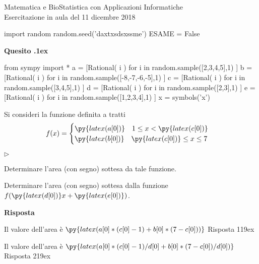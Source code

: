 \documentclass[11pt,twoside,a4paper]{article}
\newcommand{\mylabel}[1]{#1\hfill}
\renewenvironment{itemize}
  {\begin{list}{$\triangleright$}{%
   \setlength{\parskip}{0mm}
   \setlength{\topsep}{.4\baselineskip}
   \setlength{\rightmargin}{0mm}
   \setlength{\listparindent}{0mm}
   \setlength{\itemindent}{0mm}
   \setlength{\labelwidth}{2ex}
   \setlength{\itemsep}{.4\baselineskip}
   \setlength{\parsep}{0mm}
   \setlength{\partopsep}{0mm}
   \setlength{\labelsep}{1ex}
   \setlength{\leftmargin}{\labelwidth+\labelsep}
   \let\makelabel\mylabel}}{%
   \end{list}\vspace*{-1.3mm}}
\newcounter{quesito}
\newenvironment{question}{\addtocounter{quesito}{1}\par\textbf{Quesito \thequesito.\kern1ex}}{\vspace{0.5\parskip}}
\newenvironment{answer}{\par\textbf{Risposta\quad}}{\vspace{\parskip}}
\begin{document}
\colorbox{blue!10}{\begin{minipage}{\textwidth}
Matematica e BioStatistica con Applicazioni Informatiche\\
Esercitazione in aula del 11 dicembre 2018
\end{minipage}}



\begin{pycode}
import random
random.seed('daxtxsdsxssme')
ESAME = False
\end{pycode}

\bigskip
\begin{question}
\begin{pycode}
from sympy import *
a = [Rational( i ) for i in random.sample([2,3,4,5],1) ]
b = [Rational( i ) for i in random.sample([-8,-7,-6,-5],1) ]
c = [Rational( i ) for i in random.sample([3,4,5],1) ]
d = [Rational( i ) for i in random.sample([2,3],1) ]
e = [Rational( i ) for i in random.sample([1,2,3,4],1) ]
x = symbols('x')
\end{pycode}
Si consideri la funzione definita a tratti 
\[f(x) = \begin{cases} \py{latex(a[0])} \quad 1 \leq x < \py{latex(c[0])} \cr \py{latex(b[0])} \quad \py{latex(c[0])} \leq x \leq 7 \end{cases}\]
\begin{itemize}
\item[1.] Determinare l'area (con segno) sottesa da tale funzione.
\item[2.] Determinare l'area (con segno) sottesa dalla funzione $f(\py{latex(d[0])}x + \py{latex(e[0])})$.
\end{itemize}
\begin{answer}

{\color{blue} Il valore dell'area è $\py{latex(a[0]*(c[0]-1)+b[0]*(7-c[0]))}$
\hfill Risposta 1\kern19ex}

\smallskip
{\color{blue} Il valore dell'area è $\py{latex(a[0]*(c[0]-1)/d[0]+b[0]*(7-c[0])/d[0])}$
\hfill Risposta 2\kern19ex}

\end{answer}
\end{question}
\end{document}
